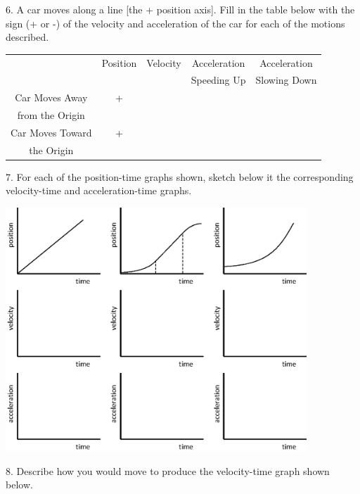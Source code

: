 6. A car moves along a line {[}the + position axis{]}. Fill in the table below
with the sign (+ or -) of the velocity and acceleration of the car for each
of the motions described.

\vspace{0.3cm}
{\centering \begin{tabular}{|c|c|c|c|c|}
\hline 
&
Position&
Velocity&
Acceleration&
Acceleration\\
&
&
&
Speeding Up&
Slowing Down\\
\hline 
Car Moves Away&
+&
&
&
\\
from the Origin&
&
&
&
\\
\hline 
Car Moves Toward&
+&
&
&
\\
the Origin&
&
&
&
\\
\hline 
\end{tabular}\par}
\vspace{0.3cm}

\newpage

7. For each of the position-time graphs shown, sketch below it the corresponding
velocity-time and acceleration-time graphs.

{\par\centering \includegraphics[width=0.85\textwidth]{slowing/slowing_fig11_new.eps} \par}

8. Describe how you would move to produce the velocity-time graph shown below.

